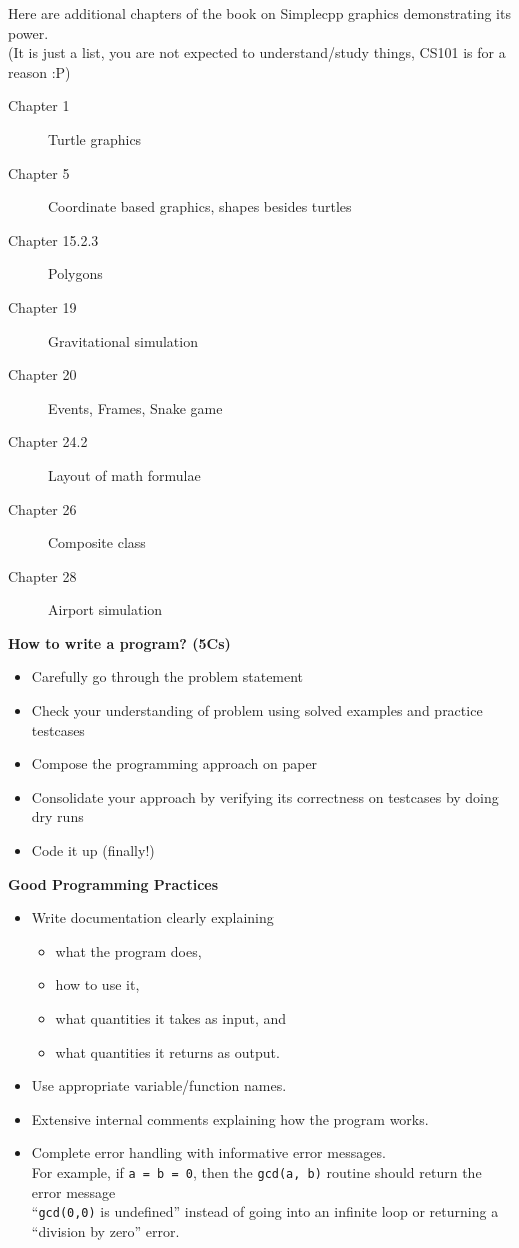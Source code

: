 Here are additional chapters of the book on Simplecpp graphics demonstrating its power.\\
(It is just a list, you are not expected to understand/study things, CS101 is for a reason :P)
\begin{description}
	\item[Chapter 1] Turtle graphics
	\item[Chapter 5] Coordinate based graphics, shapes besides turtles
	\item[Chapter 15.2.3] Polygons
	\item[Chapter 19] Gravitational simulation
	\item[Chapter 20] Events, Frames, Snake game
	\item[Chapter 24.2] Layout of math formulae
	\item[Chapter 26] Composite class
	\item[Chapter 28] Airport simulation
\end{description}
\clearpage
\begin{center}
	\textbf{\large{How to write a program? (5Cs)}}
\end{center}
\begin{itemize}
\item Carefully go through the problem statement
\item Check your understanding of problem using solved examples and practice testcases
\item Compose the programming approach on paper
\item Consolidate your approach by verifying its correctness on testcases by doing dry runs
\item Code it up (finally!)
\end{itemize}
\begin{center}
	\textbf{\large{Good Programming Practices}}
\end{center}
\begin{itemize}
\item 
Write documentation clearly explaining 
	\begin{itemize}
	\item what the program does,
	\item how to use it,
	\item what quantities it takes as input, and
	\item what quantities it returns as output.
	\end{itemize}
\item
Use appropriate variable/function names.
\item 
Extensive internal comments explaining how the program works.
\item 
Complete error handling with informative error messages.\\
For example, if \verb!a = b = 0!, then the \verb!gcd(a, b)! routine should return the error message \\``\verb!gcd(0,0)! is undefined'' instead of going into an infinite loop or returning a ``division by zero'' error.
\end{itemize}

